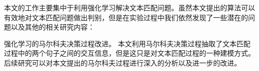 本文的工作主要集中于利用强化学习解决文本匹配问题。虽然本文提出的算法可以有效地对文本匹配问题做出判别，但是在实验过程中我们依然发现了一些潜在的问题以及其他的相关研究内容：

强化学习的马尔科夫决策过程改进。
本文利用马尔科夫决策过程抽取了文本匹配过程中的两个句子之间的交互信息，但是这只是对文本匹配过程的一种建模方式。后续研究可以对本文提出的马尔科夫过程进行深入的分析以及进一步的改进。



%
%
